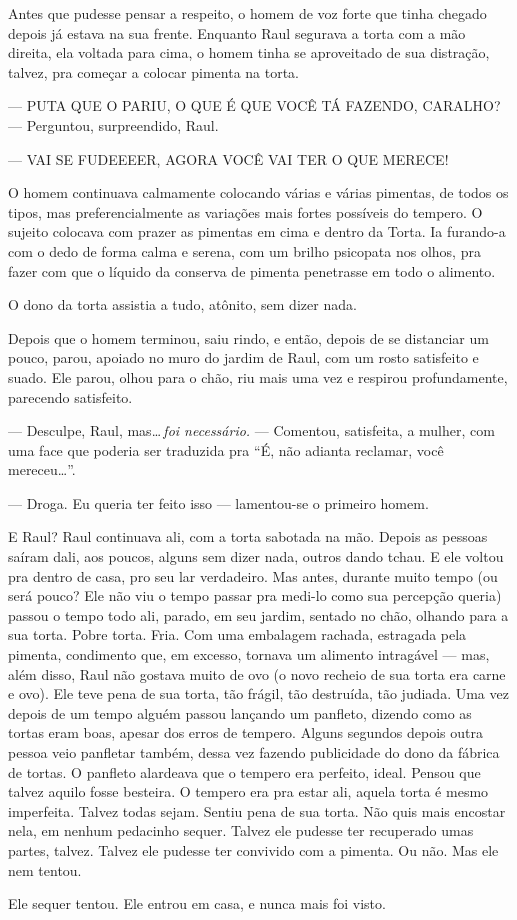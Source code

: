 Antes que pudesse pensar a respeito, o homem de voz forte que tinha chegado depois já estava na sua frente. Enquanto Raul segurava a torta com a mão direita, ela voltada para cima, o homem tinha se aproveitado de sua distração, talvez, pra começar a colocar pimenta na torta.

--- PUTA QUE O PARIU, O QUE É QUE VOCÊ TÁ FAZENDO, CARALHO? --- Perguntou, surpreendido, Raul.

--- VAI SE FUDEEEER, AGORA VOCÊ VAI TER O QUE MERECE!

O homem continuava calmamente colocando várias e várias pimentas, de todos os tipos, mas preferencialmente as variações mais fortes possíveis do tempero. O sujeito colocava com prazer as pimentas em cima e dentro da Torta. Ia furando-a com o dedo de forma calma e serena, com um brilho psicopata nos olhos, pra fazer com que o líquido da conserva de pimenta penetrasse em todo o alimento.

O dono da torta assistia a tudo, atônito, sem dizer nada.

Depois que o homem terminou, saiu rindo, e então, depois de se distanciar um pouco, parou, apoiado no muro do jardim de Raul, com um rosto satisfeito e suado. Ele parou, olhou para o chão, riu mais uma vez e respirou profundamente, parecendo satisfeito.

--- Desculpe, Raul, mas\ldots\,\emph{foi necessário.} --- Comentou, satisfeita, a mulher, com uma face que poderia ser traduzida pra ``É, não adianta reclamar, você mereceu\ldots''.

--- Droga. Eu queria ter feito isso --- lamentou-se o primeiro homem.

E Raul? Raul continuava ali, com a torta sabotada na mão. Depois as pessoas saíram dali, aos poucos, alguns sem dizer nada, outros dando tchau. E ele voltou pra dentro de casa, pro seu lar verdadeiro. Mas antes, durante muito tempo (ou será pouco? Ele não viu o tempo passar pra medi-lo como sua percepção queria) passou o tempo todo ali, parado, em seu jardim, sentado no chão, olhando para a sua torta. Pobre torta. Fria. Com uma embalagem rachada, estragada pela pimenta, condimento que, em excesso, tornava um alimento intragável --- mas, além disso, Raul não gostava muito de ovo (o novo recheio de sua torta era carne e ovo). Ele teve pena de sua torta, tão frágil, tão destruída, tão judiada. Uma vez depois de um tempo alguém passou lançando um panfleto, dizendo como as tortas eram boas, apesar dos erros de tempero. Alguns segundos depois outra pessoa veio panfletar também, dessa vez fazendo publicidade do dono da fábrica de tortas. O panfleto alardeava que o tempero era perfeito, ideal. Pensou que talvez aquilo fosse besteira. O tempero era pra estar ali, aquela torta é mesmo imperfeita. Talvez todas sejam. Sentiu pena de sua torta. Não quis mais encostar nela, em nenhum pedacinho sequer. Talvez ele pudesse ter recuperado umas partes, talvez. Talvez ele pudesse ter convivido com a pimenta. Ou não. Mas ele nem tentou.

Ele sequer tentou. Ele entrou em casa, e nunca mais foi visto.
